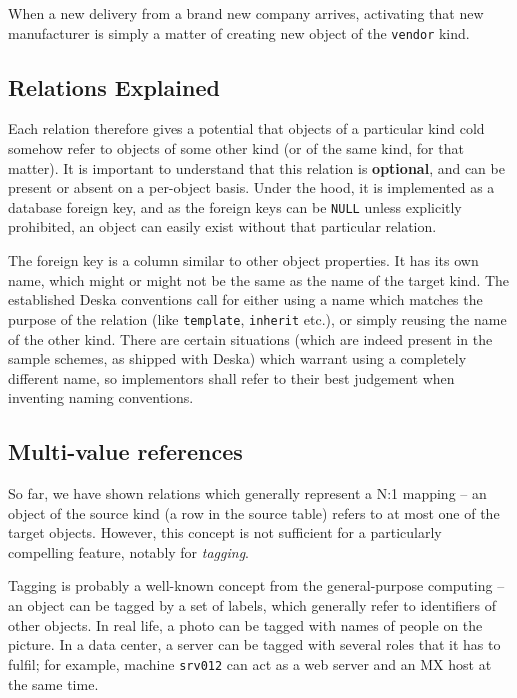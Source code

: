\documentclass{article}
\begin{document}
When a new delivery from a brand new company arrives, activating that new manufacturer is simply a matter of
creating new object of the {\tt vendor} kind.

\subsection{Relations Explained}

Each relation therefore gives a potential that objects of a particular kind cold somehow refer to objects of some other
kind (or of the same kind, for that matter).  It is important to understand that this relation is {\bf optional}, and
can be present or absent on a per-object basis.  Under the hood, it is implemented as a database foreign key, and as the
foreign keys can be {\tt NULL} unless explicitly prohibited, an object can easily exist without that particular
relation.

The foreign key is a column similar to other object properties.  It has its own name, which might or might not be the
same as the name of the target kind.  The established Deska conventions call for either using a name which matches the
purpose of the relation (like {\tt template}, {\tt inherit} etc.), or simply reusing the name of the other kind.
There are certain situations (which are indeed present in the sample schemes, as shipped with Deska) which warrant using
a completely different name, so implementors shall refer to their best judgement when inventing naming conventions.

\subsection{Multi-value references}

So far, we have shown relations which generally represent a N:1 mapping -- an object of the source kind (a row in the
source table) refers to at most one of the target objects.  However, this concept is not sufficient for a particularly
compelling feature, notably for {\em tagging}.

Tagging is probably a well-known concept from the general-purpose computing -- an object can be tagged by a set of
labels, which generally refer to identifiers of other objects.  In real life, a photo can be tagged with names of people
on the picture.  In a data center, a server can be tagged with several roles that it has to fulfil; for example, machine
{\tt srv012} can act as a web server and an MX host at the same time.
\end{document}
